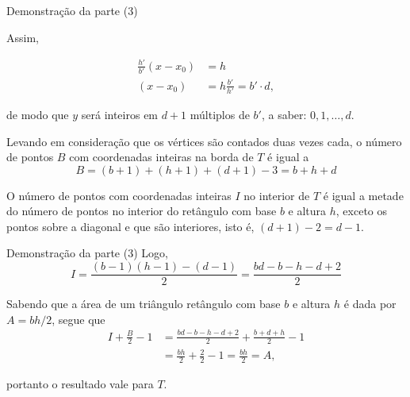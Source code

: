 \begin{frame}[fragile]{Demonstração da parte (3)}

    Assim,

    \begin{align*}
        \frac{h'}{b'}(x - x_0) &= h\\
        (x - x_0) &= h\frac{b'}{h'} = b'\cdot d,
    \end{align*}

    de modo que $y$ será inteiros em $d + 1$ múltiplos de $b'$, a saber: $0, 1, \ldots, d$.

    Levando em consideração que os vértices são contados duas vezes cada, o número de pontos $B$
    com coordenadas inteiras na borda de $T$ é igual a
    \[
        B = (b + 1) + (h + 1) + (d + 1) - 3 = b + h + d
    \]

    O número de pontos com coordenadas inteiras $I$ no interior de $T$ é igual a metade do
    número de pontos no interior do retângulo com base $b$ e altura $h$, exceto os pontos sobre
    a diagonal e que são interiores, isto é, $(d + 1) - 2 = d - 1$.
\end{frame}

\begin{frame}[fragile]{Demonstração da parte (3)}
    Logo,
    \[
        I = \frac{(b - 1)(h - 1) - (d - 1)}{2} = \frac{bd - b - h - d + 2}{2}
    \]

    Sabendo que a área de um triângulo retângulo com base $b$ e altura $h$ é dada por
    $A = bh/2$, segue que
    \begin{align*}
        I + \frac{B}{2} - 1 &= \frac{bd - b - h - d + 2}{2} + \frac{b + d + h}{2} - 1 \\
        &= \frac{bh}{2} + \frac{2}{2} - 1 = \frac{bh}{2} = A,
    \end{align*}

    portanto o resultado vale para $T$.
\end{frame}

